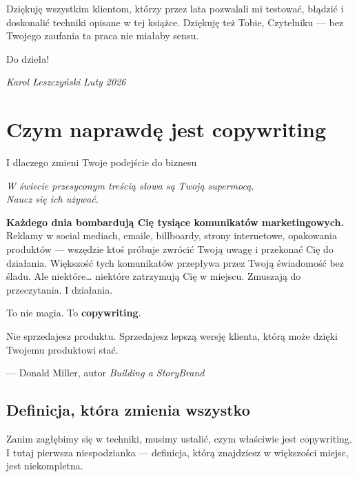 \documentclass[
  12pt,
  a4paper,
  twoside,
  openright,
  12pt,
  DIV=12,
  BCOR=12mm]{scrbook}
\newcommand{\chapteropener}[1]{%
  \begin{center}
    \large\itshape\color{textmuted}#1
  \end{center}
  \vspace{1em}
}
\begin{document}

Dziękuję wszystkim klientom, którzy przez lata pozwalali mi testować,
błądzić i doskonalić techniki opisane w tej książce. Dziękuję też Tobie,
Czytelniku --- bez Twojego zaufania ta praca nie miałaby sensu.

Do dzieła!

\emph{Karol Leszczyński} \emph{Luty 2026}


\chapter{Czym naprawdę jest
copywriting}\label{czym-naprawdux119-jest-copywriting}

I dlaczego zmieni Twoje podejście do biznesu

\hfill\break

\chapteropener{W świecie przesyconym treścią słowa są Twoją supermocą.\\Naucz się ich używać.}

\textbf{Każdego dnia bombardują Cię tysiące komunikatów marketingowych.}
Reklamy w social mediach, emaile, billboardy, strony internetowe,
opakowania produktów --- wszędzie ktoś próbuje zwrócić Twoją uwagę i
przekonać Cię do działania. Większość tych komunikatów przepływa przez
Twoją świadomość bez śladu. Ale niektóre\ldots{} niektóre zatrzymują Cię
w miejscu. Zmuszają do przeczytania. I działania.

To nie magia. To \textbf{copywriting}.

\begin{cytat}
Nie sprzedajesz produktu. Sprzedajesz lepszą wersję klienta, którą może dzięki Twojemu produktowi stać.

\hfill--- Donald Miller, autor \textit{Building a StoryBrand}
\end{cytat}

\section{Definicja, która zmienia
wszystko}\label{definicja-ktuxf3ra-zmienia-wszystko}

Zanim zagłębimy się w techniki, musimy ustalić, czym właściwie jest
copywriting. I tutaj pierwsza niespodzianka --- definicja, którą
znajdziesz w większości miejsc, jest niekompletna.
\end{document}
